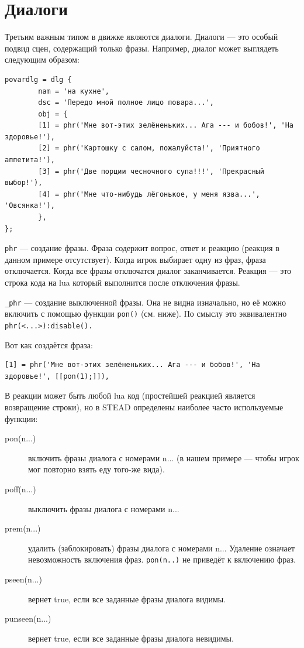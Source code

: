 \documentclass[a4paper,12pt]{article}
\begin{document}
\section{Диалоги}


Третьим важным типом в движке являются диалоги. Диалоги --- это особый подвид сцен, содержащий только фразы. Например, диалог может выглядеть следующим образом:

\begin{verbatim}
povardlg = dlg {
        nam = 'на кухне',
        dsc = 'Передо мной полное лицо повара...',
        obj = {
        [1] = phr('Мне вот-этих зелёненьких... Ага --- и бобов!', 'На здоровье!'),
        [2] = phr('Картошку с салом, пожалуйста!', 'Приятного аппетита!'),
        [3] = phr('Две порции чесночного супа!!!', 'Прекрасный выбор!'),
        [4] = phr('Мне что-нибудь лёгонькое, у меня язва...', 'Овсянка!'),
        },
};
\end{verbatim}

\verb/phr/ --- создание фразы. Фраза содержит вопрос, ответ и реакцию (реакция в данном примере отсутствует). Когда игрок выбирает одну из фраз, фраза отключается. Когда все фразы отключатся диалог заканчивается. Реакция --- это строка кода на lua который выполнится после отключения фразы.

\verb/_phr/ --- создание выключенной фразы. Она не видна изначально, но её можно включить с помощью функции \verb/pon()/ (см. ниже). По смыслу это эквивалентно \verb/phr(<...>):disable()./

Вот как создаётся фраза:

\begin{verbatim}
[1] = phr('Мне вот-этих зелёненьких... Ага --- и бобов!', 'На здоровье!', [[pon(1);]]),
\end{verbatim}

В реакции может быть любой lua код (простейшей реакцией является возвращение строки), но в STEAD определены наиболее часто используемые функции:

\begin{description}
\item[pon(n...)] включить фразы диалога с номерами n... (в нашем примере --- чтобы игрок мог повторно взять еду того-же вида).
\item[poff(n...)] выключить фразы диалога с номерами n...
\item[prem(n...)] удалить (заблокировать) фразы диалога с номерами n... Удаление означает невозможность включения фраз. \verb/pon(n..)/ не приведёт к включению фраз.
\item[pseen(n...)] вернет true, если все заданные фразы диалога видимы.
\item[punseen(n...)] вернет true, если все заданные фразы диалога невидимы.
\end{description}
\end{document}
